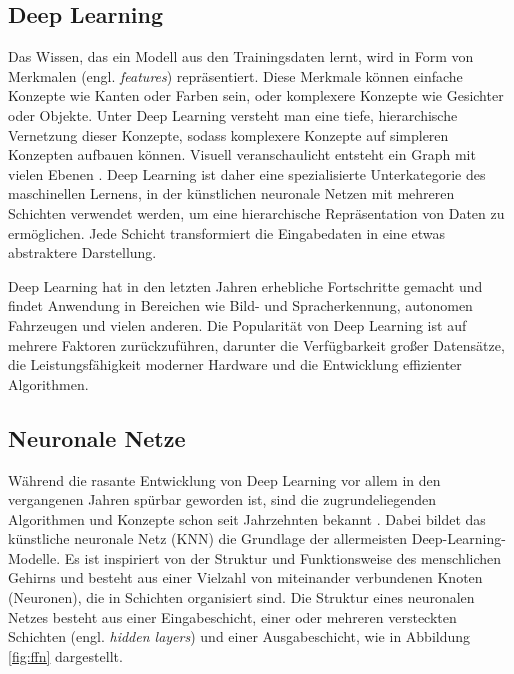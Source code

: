 \subsection{Deep Learning} \label{sec:deep-learning}

Das Wissen, das ein Modell aus den Trainingsdaten lernt, wird in Form von Merkmalen (engl. \textit{features}) repräsentiert. Diese Merkmale können einfache Konzepte wie Kanten oder Farben sein, oder komplexere Konzepte wie Gesichter oder Objekte. Unter Deep Learning versteht man eine tiefe, hierarchische Vernetzung dieser Konzepte, sodass komplexere Konzepte auf simpleren Konzepten aufbauen können. Visuell veranschaulicht entsteht ein Graph mit vielen Ebenen \parencite{Goodfellow2016deeplearning}. Deep Learning ist daher eine spezialisierte Unterkategorie des maschinellen Lernens, in der künstlichen neuronale Netzen mit mehreren Schichten verwendet werden, um eine hierarchische Repräsentation von Daten zu ermöglichen. Jede Schicht transformiert die Eingabedaten in eine etwas abstraktere Darstellung.

Deep Learning hat in den letzten Jahren erhebliche Fortschritte gemacht und findet Anwendung in Bereichen wie Bild- und Spracherkennung, autonomen Fahrzeugen und vielen anderen. Die Popularität von Deep Learning ist auf mehrere Faktoren zurückzuführen, darunter die Verfügbarkeit großer Datensätze, die Leistungsfähigkeit moderner Hardware und die Entwicklung effizienter Algorithmen. \parencite{Zhou2021machinelearning}

\subsection{Neuronale Netze} \label{sec:neural-networks}

Während die rasante Entwicklung von Deep Learning vor allem in den vergangenen Jahren spürbar geworden ist, sind die zugrundeliegenden Algorithmen und Konzepte schon seit Jahrzehnten bekannt \parencite{Zhou2021machinelearning}. Dabei bildet das künstliche neuronale Netz (KNN) die Grundlage der allermeisten Deep-Learning-Modelle. Es ist inspiriert von der Struktur und Funktionsweise des menschlichen Gehirns und besteht aus einer Vielzahl von miteinander verbundenen Knoten (Neuronen), die in Schichten organisiert sind. Die Struktur eines neuronalen Netzes besteht aus einer Eingabeschicht, einer oder mehreren versteckten Schichten (engl. \textit{hidden layers}) und einer Ausgabeschicht, wie in Abbildung \ref{fig:ffn} dargestellt.

